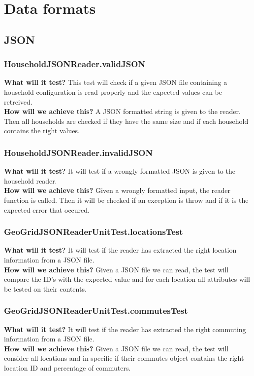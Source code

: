 \documentclass{article}
\begin{document}
\section{Data formats}
\subsection{JSON}
\subsubsection{HouseholdJSONReader.validJSON}
\textbf{What will it test?}
This test will check if a given JSON file containing a household configuration is read properly and the expected values can be retreived. \\
\newline
\textbf{How will we achieve this?}
A JSON formatted string is given to the reader. Then all households are checked if they have the same size and if each household contains the right values.

\subsubsection{HouseholdJSONReader.invalidJSON}
\textbf{What will it test?}
It will test if a wrongly formatted JSON is given to the household reader.\\
\newline
\textbf{How will we achieve this?}
Given a wrongly formatted input, the reader function is called. Then it will be checked if an exception is throw and if it is the expected error that occured.

\subsubsection{GeoGridJSONReaderUnitTest.locationsTest}
\textbf{What will it test?}
It will test if the reader has extracted the right location information from a JSON file. \\
\newline
\textbf{How will we achieve this?}
Given a JSON file we can read, the test will compare the ID's with the expected value and for each location all attributes will be tested on their contents.

\subsubsection{GeoGridJSONReaderUnitTest.commutesTest}
\textbf{What will it test?}
It will test if the reader has extracted the right commuting information from a JSON file. \\
\newline
\textbf{How will we achieve this?}
Given a JSON file we can read, the test will consider all locations and in specific if their commutes object contains the right location ID and percentage of commuters.
\end{document}
